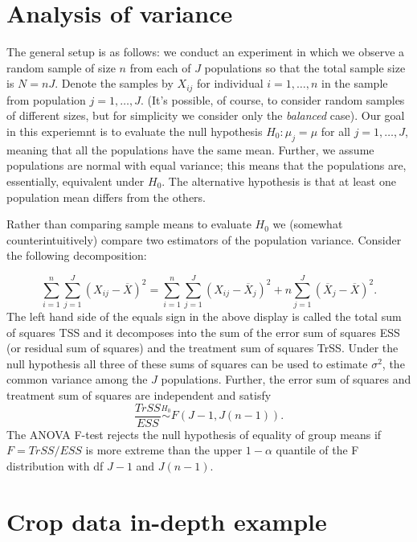 \documentclass[
]{book}
\begin{document}
\hypertarget{analysis-of-variance}{%
\section{Analysis of variance}\label{analysis-of-variance}}

The general setup is as follows: we conduct an experiment in which we observe a random sample of size \(n\) from each of \(J\) populations so that the total sample size is \(N=nJ\). Denote the samples by \(X_{ij}\) for individual \(i=1, \ldots, n\) in the sample from population \(j=1,\ldots, J\). (It's possible, of course, to consider random samples of different sizes, but for simplicity we consider only the \emph{balanced} case). Our goal in this experiemnt is to evaluate the null hypothesis \(H_0: \mu_j = \mu\) for all \(j = 1,\ldots, J\), meaning that all the populations have the same mean. Further, we assume populations are normal with equal variance; this means that the populations are, essentially, equivalent under \(H_0\). The alternative hypothesis is that at least one population mean differs from the others.

Rather than comparing sample means to evaluate \(H_0\) we (somewhat counterintuitively) compare two estimators of the population variance. Consider the following decomposition:

\[\sum_{i=1}^n\sum_{j=1}^J(X_{ij} - \overline X)^2 = \sum_{i=1}^n\sum_{j=1}^J (X_{ij} - \overline X_j)^2 + n\sum_{j=1}^J (\overline X_j - \overline X)^2.\]
The left hand side of the equals sign in the above display is called the total sum of squares TSS and it decomposes into the sum of the error sum of squares ESS (or residual sum of squares) and the treatment sum of squares TrSS. Under the null hypothesis all three of these sums of squares can be used to estimate \(\sigma^2\), the common variance among the \(J\) populations. Further, the error sum of squares and treatment sum of squares are independent and satisfy
\[\frac{TrSS}{ESS} \stackrel{H_0}{\sim}F(J-1, J(n-1)).\]
The ANOVA F-test rejects the null hypothesis of equality of group means if \(F = TrSS/ESS\) is more extreme than the upper \(1-\alpha\) quantile of the F distribution with df \(J-1\) and \(J(n-1)\).

\hypertarget{crop-data-in-depth-example}{%
\section{Crop data in-depth example}\label{crop-data-in-depth-example}}
\end{document}

